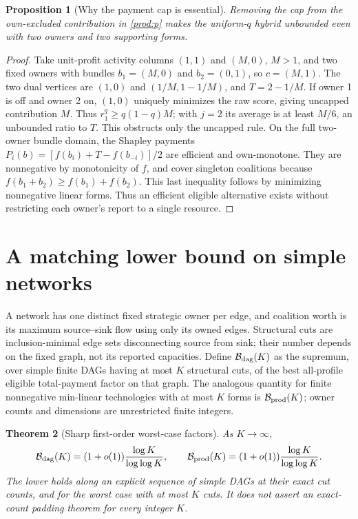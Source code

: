 \documentclass[11pt]{article}
\newtheorem{theorem}{Theorem}[section]
\newtheorem{proposition}[theorem]{Proposition}
\theoremstyle{definition}\newtheorem{definition}[theorem]{Definition}
\theoremstyle{remark}\newtheorem{remark}[theorem]{Remark}
\begin{document}
\begin{proposition}[Why the payment cap is essential]\label{prod:uncapped}
Removing the cap from the own-excluded contribution in
\eqref{prod:p} makes the uniform-$q$ hybrid unbounded even with two owners
and two supporting forms.
\end{proposition}
\begin{proof}
Take unit-profit activity columns $(1,1)$ and $(M,0)$, $M>1$, and two
fixed owners with bundles $b_1=(M,0)$ and $b_2=(0,1)$, so $c=(M,1)$. The two dual vertices are $(1,0)$ and $(1/M,1-1/M)$, and
$T=2-1/M$. If owner 1 is off and owner 2 on, $(1,0)$ uniquely minimizes the
raw score, giving uncapped contribution $M$. Thus $r_1^q\ge q(1-q)M$;
with $j=2$ its average is at least $M/6$, an unbounded ratio to $T$.
This obstructs only the uncapped rule. On the full two-owner bundle
domain, the Shapley payments
$P_i(b)=[f(b_i)+T-f(b_{-i})]/2$ are efficient and own-monotone.
They are nonnegative by monotonicity of $f$, and cover singleton coalitions
because $f(b_1+b_2)\ge f(b_1)+f(b_2)$. This last inequality follows by
minimizing nonnegative linear forms. Thus an efficient eligible alternative
exists without restricting each owner's report to a single resource.
\end{proof}

\section{A matching lower bound on simple networks}\label{dag:section}
A network has one distinct fixed strategic owner per edge, and coalition
worth is its maximum source--sink flow using only its owned edges. Structural
cuts are inclusion-minimal edge sets disconnecting source from sink; their
number depends on the fixed graph, not its reported capacities. Define
$\mathcal B_{\rm dag}(K)$ as the supremum, over simple finite DAGs having at
most $K$ structural cuts, of the best all-profile eligible total-payment
factor on that graph. The analogous quantity for finite nonnegative
min-linear technologies with at most $K$ forms is $\mathcal B_{\rm prod}(K)$;
owner counts and dimensions are unrestricted finite integers.

\begin{theorem}[Sharp first-order worst-case factors]\label{dag:sharp}
As $K\to\infty$,
\[
 \mathcal B_{\rm dag}(K)=(1+o(1))\frac{\log K}{\log\log K},\qquad
 \mathcal B_{\rm prod}(K)=(1+o(1))\frac{\log K}{\log\log K}.
\]
The lower holds along an explicit sequence of simple DAGs at their exact cut
counts, and for the worst case with \emph{at most} $K$ cuts. It does not
assert an exact-count padding theorem for every integer $K$.
\end{theorem}
\end{document}
